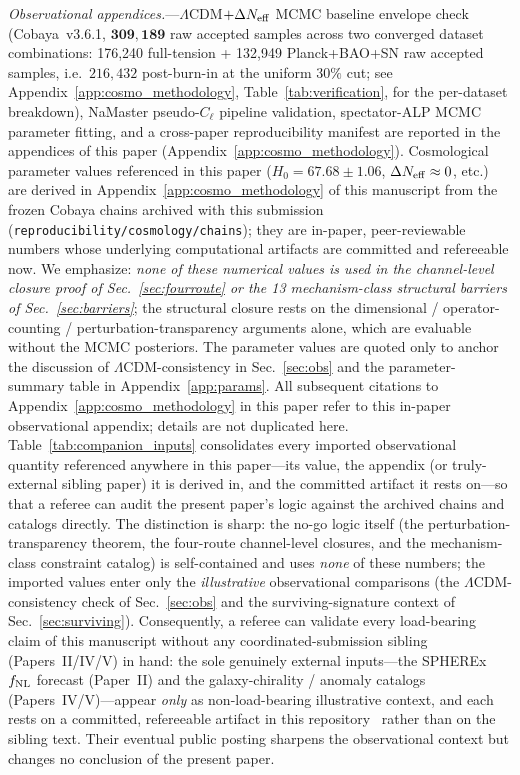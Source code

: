 \documentclass[aps,prd,twocolumn,superscriptaddress,showpacs,preprintnumbers,nofootinbib,longbibliography,floatfix]{revtex4-2}
\newcommand{\Neff}{N_{\rm eff}}
\newcommand{\fnl}{f_{\rm NL}}
\begin{document}
\textit{Observational appendices.}---$\Lambda$CDM$+\Delta\Neff$ MCMC baseline
envelope check (Cobaya~v3.6.1, $\mathbf{309{,}189}$ raw accepted samples across two
converged dataset combinations: 176{,}240 full-tension + 132{,}949
Planck+BAO+SN raw accepted samples, i.e.\ $216{,}432$ post-burn-in at the
uniform $30\%$ cut; see Appendix~\ref{app:cosmo_methodology},
Table~\ref{tab:verification}, for the per-dataset breakdown),
NaMaster pseudo-$C_\ell$ pipeline
validation, spectator-ALP MCMC parameter fitting, and a cross-paper
reproducibility manifest are reported in the appendices of this paper
(Appendix~\ref{app:cosmo_methodology}).
Cosmological parameter values referenced in this paper
($H_0 = 67.68\pm 1.06$, $\Delta\Neff\approx 0$, etc.) are derived in
Appendix~\ref{app:cosmo_methodology} of this manuscript from the frozen
Cobaya chains archived with this submission
(\texttt{reproducibility/cosmology/chains}); they are in-paper,
peer-reviewable numbers whose underlying computational artifacts are
committed and refereeable now. We emphasize: \emph{none of these numerical
values is used in the channel-level closure proof of
Sec.~\ref{sec:fourroute} or the 13 mechanism-class structural
barriers of Sec.~\ref{sec:barriers}}; the structural closure rests on
the dimensional / operator-counting / perturbation-transparency
arguments alone, which are evaluable without the MCMC
posteriors. The parameter values are quoted only to anchor the
discussion of $\Lambda$CDM-consistency in Sec.~\ref{sec:obs} and the
parameter-summary table in Appendix~\ref{app:params}.
All subsequent citations to Appendix~\ref{app:cosmo_methodology} in this paper
refer to this in-paper observational appendix; details are not duplicated here.
Table~\ref{tab:companion_inputs} consolidates every imported observational
quantity referenced anywhere in this paper---its value, the appendix (or
truly-external sibling paper) it is derived in, and the committed artifact
it rests on---so that a referee can audit the present paper's logic against
the archived chains and catalogs directly. The distinction is sharp: the
no-go logic itself (the perturbation-transparency theorem, the four-route
channel-level closures, and the mechanism-class constraint catalog) is
self-contained and uses \emph{none} of these numbers; the imported values
enter only the \emph{illustrative} observational comparisons (the
$\Lambda$CDM-consistency check of Sec.~\ref{sec:obs} and the
surviving-signature context of Sec.~\ref{sec:surviving}).
Consequently, a referee can validate every load-bearing claim of this manuscript
without any coordinated-submission sibling (Papers~II/IV/V) in hand: the sole
genuinely external inputs---the SPHEREx $\fnl$ forecast (Paper~II) and the
galaxy-chirality / anomaly catalogs (Papers~IV/V)---appear \emph{only} as
non-load-bearing illustrative context, and each rests on a committed, refereeable
artifact in this repository~\cite{BigBounceRepro} rather than on the sibling
text. Their eventual public posting sharpens the observational context but
changes no conclusion of the present paper.
\end{document}
